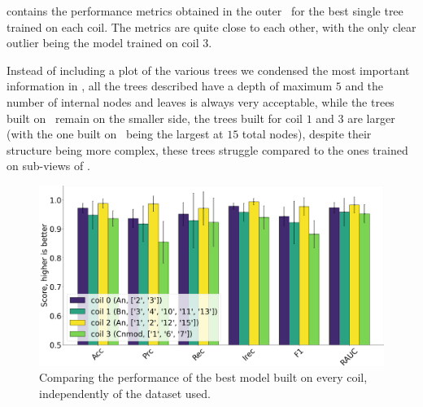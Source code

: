  contains the performance metrics obtained in the outer \cv\ for the best single
tree trained on each coil. The metrics are quite close to each other, with the only clear outlier
being the model trained on coil $3$.

Instead of including a plot of the various trees we condensed the most important information
in , all the trees described have a depth of maximum $5$ and the number
of internal nodes and leaves is always very acceptable, while the trees built on \an\ remain on the
smaller side, the trees built for coil $1$ and $3$ are larger (with the one built on \cnmod\ being
the largest at $15$ total nodes), despite their structure being more complex, these trees struggle
compared to the ones trained on sub-views of \an.

\begin{figure}[!ht]
	\centering
	\includegraphics[width=\linewidth]{img/best_dts_qlp.png}
	\caption{Comparing the performance of the best model built on every coil, independently of
		the dataset used.} \label{fig:bdts-qlp}
\end{figure}

